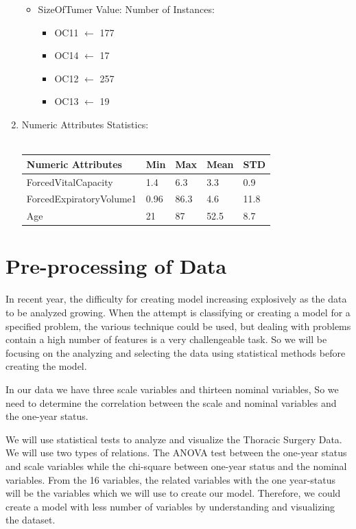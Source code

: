 \documentclass[a4paper, 11pt, oneside]{article} %
\begin{document}
\begin{enumerate}
\begin{itemize}
\item{SizeOfTumer Value: Number of Instances:}
\begin{itemize}
\item OC11 $\leftarrow$ 177
\item OC14 $\leftarrow$ 17
\item OC12 $\leftarrow$ 257
\item OC13 $\leftarrow$ 19
\end{itemize}
\end{itemize}
\item {Numeric Attributes Statistics:}\\\\
\begin{tabular}{ |p{4.5cm}||p{2cm}|p{2cm}|p{2cm}| p{2cm}| }
 \hline
 Numeric Attributes&Min& Max&Mean&STD\\
 \hline
ForcedVitalCapacity   & 1.4    &6.3&  3.3 &0.9 \\
ForcedExpiratoryVolume1 &  0.96  & 86.3   &4.6 &11.8\\
 Age &21 & 87&  52.5 & 8.7\\
 \hline
\end{tabular}

\end{enumerate}

\section {Pre-processing of Data}
In recent year, the difficulty for creating model increasing explosively as the data to be analyzed growing. When the attempt is classifying or creating a model for a specified problem, the various technique could be used, but dealing with problems contain a high number of features is a very challengeable task. So we will be focusing on the analyzing and selecting the data using statistical methods before creating the model.

In our data we have three scale variables and thirteen nominal variables, So we need to determine the correlation between the scale and nominal variables and the one-year status.

We will use statistical tests to analyze and visualize the Thoracic Surgery Data. We will use two types of relations. The ANOVA test between the one-year status and scale variables while the chi-square between one-year status and the nominal variables. From the 16 variables, the related variables with the one year-status will be the variables which we will use to create our model. Therefore, we could create a model with less number of variables by understanding and visualizing the dataset. 
\end{document}
